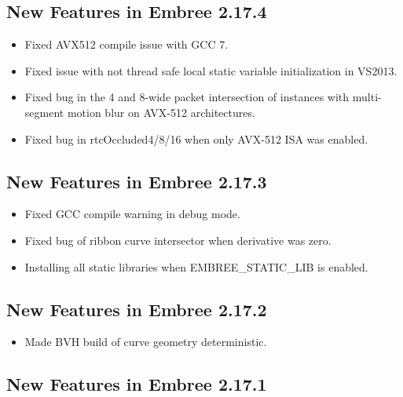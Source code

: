 \subsection{New Features in Embree
2.17.4}\label{new-features-in-embree-2.17.4}

\begin{itemize}
\tightlist
\item
  Fixed AVX512 compile issue with GCC 7.
\item
  Fixed issue with not thread safe local static variable initialization
  in VS2013.
\item
  Fixed bug in the 4 and 8-wide packet intersection of instances with
  multi-segment motion blur on AVX-512 architectures.
\item
  Fixed bug in rtcOccluded4/8/16 when only AVX-512 ISA was enabled.
\end{itemize}

\subsection{New Features in Embree
2.17.3}\label{new-features-in-embree-2.17.3}

\begin{itemize}
\tightlist
\item
  Fixed GCC compile warning in debug mode.
\item
  Fixed bug of ribbon curve intersector when derivative was zero.
\item
  Installing all static libraries when EMBREE\_STATIC\_LIB is enabled.
\end{itemize}

\subsection{New Features in Embree
2.17.2}\label{new-features-in-embree-2.17.2}

\begin{itemize}
\tightlist
\item
  Made BVH build of curve geometry deterministic.
\end{itemize}

\subsection{New Features in Embree
2.17.1}\label{new-features-in-embree-2.17.1}

